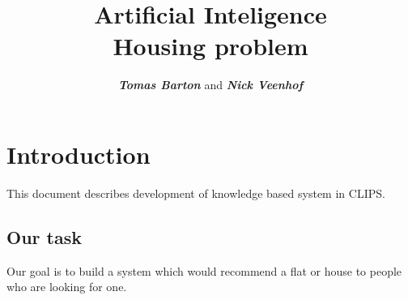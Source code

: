 \documentclass[11pt,twoside,a4paper]{mr}%
\title{\huge\textbf{Artificial Inteligence \\ Housing problem}}
\author{\textit{\textbf{Tomas Barton}} and \textit{\textbf{Nick Veenhof}}}
\begin{document}
\maketitle


\chapter{Introduction}
This document describes development of knowledge based system in CLIPS.  

\section{Our task}
Our goal is to build a system which would recommend a flat or house to people who are looking for one. 

\clearpage
\end{document}

